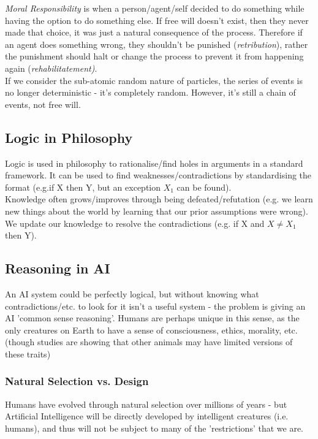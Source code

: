 \emph{Moral Responsibility} is when a person/agent/self decided to do something while having the option to do something else. If free will doesn't exist, then they never made that choice, it was just a natural consequence of the process. Therefore if an agent does something wrong, they shouldn't be punished (\emph{retribution}), rather the punishment should halt or change the process to prevent it from happening again (\emph{rehabilitatement)}.\\

If we consider the sub-atomic random nature of particles, the series of events is no longer deterministic - it's completely random. However, it's still a chain of events, not free will. 


\subsection{Logic in Philosophy}\label{subsec:logic_in_philosophy}
Logic is used in philosophy to rationalise/find holes in arguments in a standard framework. It can be used to find weaknesses/contradictions by standardising the format (e.g.if X then Y, but an exception $X_1$ can be found). \\

Knowledge often grows/improves through being defeated/refutation (e.g. we learn new things about the world by learning that our prior assumptions were wrong). We update our knowledge to resolve the contradictions (e.g. if X and $X \neq X_1$ then Y).

\subsection{Reasoning in AI}
An AI system could be perfectly logical, but without knowing what contradictions/etc. to look for it isn't a useful system - the problem is giving an AI 'common sense reasoning'. Humans are perhaps unique in this sense, as the only creatures on Earth to have a  sense of consciousness, ethics, morality, etc. (though studies are showing that other animals may have limited versions of these traits) 

\subsubsection{Natural Selection vs. Design}
Humans have evolved through natural selection over millions of years - but Artificial Intelligence will be directly developed by intelligent creatures (i.e. humans), and thus will not be subject to many of the 'restrictions' that we are.\\

